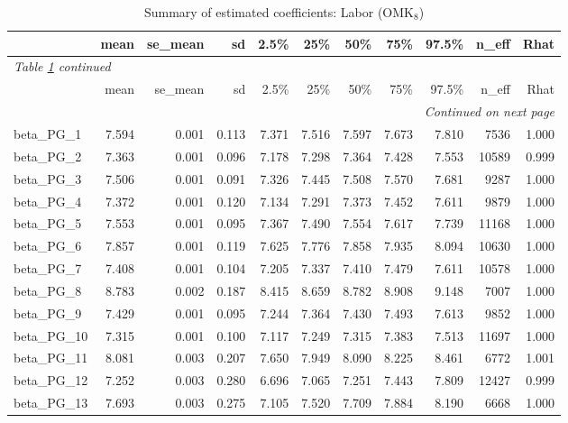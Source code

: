 \documentclass[12pt]{article}
\begin{document}
\begingroup
\footnotesize
\setlength{\tabcolsep}{3pt}
\begin{longtable}{lrrrrrrrrrr}
\caption{Summary of estimated coefficients: Labor (OMK$_\text{8}$)}
\label{tab:coef_summary_omk8} \\
\toprule
 & mean & se\_mean & sd & 2.5\% & 25\% & 50\% & 75\% & 97.5\% & n\_eff & Rhat \\
\midrule
\endfirsthead
\multicolumn{11}{l}{\textit{Table \ref{tab:coef_summary_omk8} continued}} \\
\toprule
 & mean & se\_mean & sd & 2.5\% & 25\% & 50\% & 75\% & 97.5\% & n\_eff & Rhat \\
\midrule
\endhead
\midrule
\multicolumn{11}{r}{\textit{Continued on next page}} \\
\endfoot
\bottomrule
\endlastfoot
beta\_PG\_1   &  7.594 & 0.001 & 0.113 &  7.371 &  7.516 &  7.597 &  7.673 &  7.810 &  7536 & 1.000 \\
beta\_PG\_2   &  7.363 & 0.001 & 0.096 &  7.178 &  7.298 &  7.364 &  7.428 &  7.553 & 10589 & 0.999 \\
beta\_PG\_3   &  7.506 & 0.001 & 0.091 &  7.326 &  7.445 &  7.508 &  7.570 &  7.681 &  9287 & 1.000 \\
beta\_PG\_4   &  7.372 & 0.001 & 0.120 &  7.134 &  7.291 &  7.373 &  7.452 &  7.611 &  9879 & 1.000 \\
beta\_PG\_5   &  7.553 & 0.001 & 0.095 &  7.367 &  7.490 &  7.554 &  7.617 &  7.739 & 11168 & 1.000 \\
beta\_PG\_6   &  7.857 & 0.001 & 0.119 &  7.625 &  7.776 &  7.858 &  7.935 &  8.094 & 10630 & 1.000 \\
beta\_PG\_7   &  7.408 & 0.001 & 0.104 &  7.205 &  7.337 &  7.410 &  7.479 &  7.611 & 10578 & 1.000 \\
beta\_PG\_8   &  8.783 & 0.002 & 0.187 &  8.415 &  8.659 &  8.782 &  8.908 &  9.148 &  7007 & 1.000 \\
beta\_PG\_9   &  7.429 & 0.001 & 0.095 &  7.244 &  7.364 &  7.430 &  7.493 &  7.613 &  9852 & 1.000 \\
beta\_PG\_10  &  7.315 & 0.001 & 0.100 &  7.117 &  7.249 &  7.315 &  7.383 &  7.513 & 11697 & 1.000 \\
beta\_PG\_11  &  8.081 & 0.003 & 0.207 &  7.650 &  7.949 &  8.090 &  8.225 &  8.461 &  6772 & 1.001 \\
beta\_PG\_12  &  7.252 & 0.003 & 0.280 &  6.696 &  7.065 &  7.251 &  7.443 &  7.809 & 12427 & 0.999 \\
beta\_PG\_13  &  7.693 & 0.003 & 0.275 &  7.105 &  7.520 &  7.709 &  7.884 &  8.190 &  6668 & 1.000 \\

\end{longtable}
\end{document}
